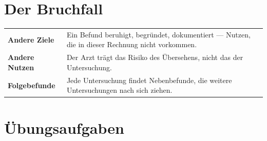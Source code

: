\section{Der Bruchfall}

\begin{warnung}
\begin{center}
{\small
\renewcommand{\arraystretch}{1.52}
\begin{tabular}{@{}P{2.6cm}P{6.0cm}@{}}
\toprule
\textbf{Andere Ziele} & Ein Befund beruhigt, begründet, dokumentiert --- Nutzen, die in dieser Rechnung nicht vorkommen.\\
\textbf{Andere Nutzen} & Der Arzt trägt das Risiko des Übersehens, nicht das der Untersuchung.\\
\textbf{Folgebefunde} & Jede Untersuchung findet Nebenbefunde, die weitere Untersuchungen nach sich ziehen.\\
\bottomrule
\end{tabular}}
\end{center}

\begin{center}
\begin{minipage}{0.88\textwidth}
\end{minipage}
\end{center}
\end{warnung}

\section{Übungsaufgaben}

